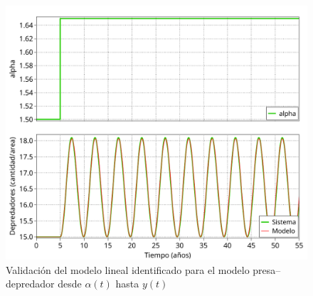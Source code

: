 \begin{figure}
    \centering
    \includegraphics[width = 0.45\linewidth]{figs/validacion_ident.pdf}
    \caption{Validación del modelo lineal identificado para el modelo presa--depredador desde $\alpha(t)$ hasta $y(t)$}
    \label{fig3}
\end{figure}

